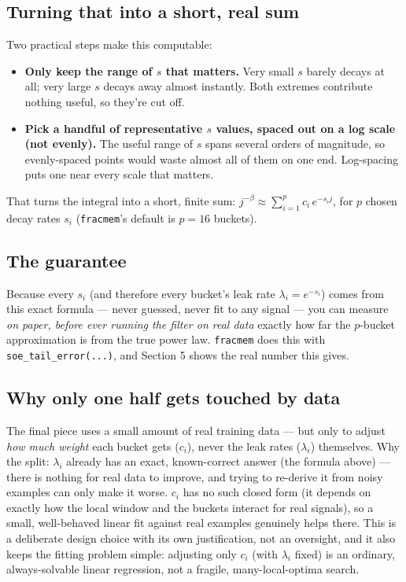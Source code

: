 \documentclass[11pt]{article}
\begin{document}
\subsection{Turning that into a short, real sum}
Two practical steps make this computable:
\begin{itemize}
\item \textbf{Only keep the range of $s$ that matters.} Very small $s$ barely decays at all; very large $s$ decays away almost instantly. Both extremes contribute nothing useful, so they're cut off.
\item \textbf{Pick a handful of representative $s$ values, spaced out on a log scale (not evenly).} The useful range of $s$ spans several orders of magnitude, so evenly-spaced points would waste almost all of them on one end. Log-spacing puts one near every scale that matters.
\end{itemize}
That turns the integral into a short, finite sum: $j^{-\beta} \approx \sum_{i=1}^p c_i\, e^{-s_i j}$, for $p$ chosen decay rates $s_i$ (\texttt{fracmem}'s default is $p=16$ buckets).

\subsection{The guarantee}
Because every $s_i$ (and therefore every bucket's leak rate $\lambda_i = e^{-s_i}$) comes from this exact formula --- never guessed, never fit to any signal --- you can measure \emph{on paper, before ever running the filter on real data} exactly how far the $p$-bucket approximation is from the true power law. \texttt{fracmem} does this with \texttt{soe\_tail\_error(...)}, and Section 5 shows the real number this gives.

\subsection{Why only one half gets touched by data}
The final piece uses a small amount of real training data --- but only to adjust \emph{how much weight} each bucket gets ($c_i$), never the leak rates ($\lambda_i$) themselves. Why the split: $\lambda_i$ already has an exact, known-correct answer (the formula above) --- there is nothing for real data to improve, and trying to re-derive it from noisy examples can only make it worse. $c_i$ has no such closed form (it depends on exactly how the local window and the buckets interact for real signals), so a small, well-behaved linear fit against real examples genuinely helps there. This is a deliberate design choice with its own justification, not an oversight, and it also keeps the fitting problem simple: adjusting only $c_i$ (with $\lambda_i$ fixed) is an ordinary, always-solvable linear regression, not a fragile, many-local-optima search.
\end{document}
